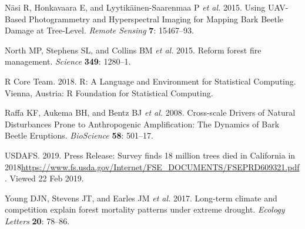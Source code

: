 \documentclass[]{article}
\begin{document}
\hypertarget{ref-nasi2015}{}
Näsi R, Honkavaara E, and Lyytikäinen-Saarenmaa P \emph{et al.} 2015.
Using UAV-Based Photogrammetry and Hyperspectral Imaging for Mapping
Bark Beetle Damage at Tree-Level. \emph{Remote Sensing} \textbf{7}:
15467--93.

\hypertarget{ref-north2015}{}
North MP, Stephens SL, and Collins BM \emph{et al.} 2015. Reform forest
fire management. \emph{Science} \textbf{349}: 1280--1.

\hypertarget{ref-rcoreteam2018}{}
R Core Team. 2018. R: A Language and Environment for Statistical
Computing. Vienna, Austria: R Foundation for Statistical Computing.

\hypertarget{ref-raffa2008}{}
Raffa KF, Aukema BH, and Bentz BJ \emph{et al.} 2008. Cross-scale
Drivers of Natural Disturbances Prone to Anthropogenic Amplification:
The Dynamics of Bark Beetle Eruptions. \emph{BioScience} \textbf{58}:
501--17.

\hypertarget{ref-usdafs2019}{}
USDAFS. 2019. Press Release: Survey finds 18 million trees died in
California in
2018\url{https://www.fs.usda.gov/Internet/FSE_DOCUMENTS/FSEPRD609321.pdf}.
Viewed 22 Feb 2019.

\hypertarget{ref-young2017}{}
Young DJN, Stevens JT, and Earles JM \emph{et al.} 2017. Long-term
climate and competition explain forest mortality patterns under extreme
drought. \emph{Ecology Letters} \textbf{20}: 78--86.
\end{document}
